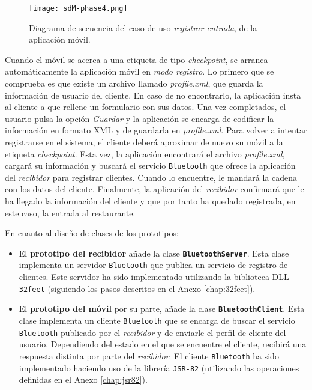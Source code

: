   \begin{sidewaysfigure}[hp]
    \begin{center}
      \texttt{[image: sdM-phase4.png]}
      \caption{Diagrama de secuencia del caso de uso \emph{registrar entrada},
      de la aplicación móvil.}
      \label{fig:sdM-phase4}
    \end{center}
  \end{sidewaysfigure}
\newpage
Cuando el móvil se acerca a una etiqueta de tipo \emph{checkpoint}, se
arranca automáticamente la aplicación móvil en \emph{modo registro}. Lo
primero que se comprueba es que existe un archivo llamado \emph{profile.xml},
que guarda la información de usuario del cliente. En caso de no encontrarlo,
la aplicación insta al cliente a que rellene un formulario con sus datos.
Una vez completados, el usuario pulsa la opción \emph{Guardar} y la
aplicación se encarga de codificar la información en formato \acs{XML} y de
guardarla en \emph{profile.xml}. Para volver a intentar registrarse en el
sistema, el cliente deberá aproximar de nuevo su móvil a la etiqueta
\emph{checkpoint}. Esta vez, la aplicación encontrará el archivo
\emph{profile.xml}, cargará su información y buscará el servicio
\texttt{Bluetooth} que ofrece la aplicación del \emph{recibidor} para
registrar clientes. Cuando lo encuentre, le mandará la cadena con los datos
del cliente. Finalmente, la aplicación del \emph{recibidor} confirmará que
le ha llegado la información del cliente y que por tanto ha quedado
registrada, en este caso, la entrada al restaurante.

En cuanto al diseño de clases de los prototipos:
\begin{itemize}
\item El \textbf{prototipo del recibidor} añade la clase
\textbf{\texttt{BluetoothServer}}. Esta clase implementa un servidor
\texttt{Bluetooth} que publica un servicio de registro de clientes. Este
servidor ha sido implementado utilizando la biblioteca \acs{DLL}
\texttt{32feet} (siguiendo los pasos descritos en el Anexo \ref{chap:32feet}).
\item El \textbf{prototipo del móvil} por su parte, añade la clase
\textbf{\texttt{BluetoothClient}}. Esta clase implementa un cliente
\texttt{Bluetooth} que se encarga de buscar el servicio \texttt{Bluetooth}
publicado por el \emph{recibidor} y de enviarle el perfil de cliente del
usuario. Dependiendo del estado en el que se encuentre el cliente, recibirá
una respuesta distinta por parte del \emph{recibidor}. El cliente
\texttt{Bluetooth} ha sido implementado haciendo uso de la librería
\texttt{\acs{JSR}-82} (utilizando las operaciones definidas en el Anexo
\ref{chap:jsr82}).
\end{itemize}
\newpage
